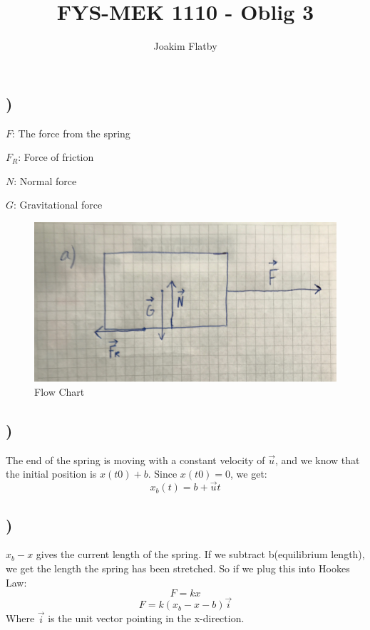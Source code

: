 \documentclass[a4paper,10pt,norsk]{article}
\title{FYS-MEK 1110 - Oblig 3}
\author{Joakim Flatby}
\begin{document}
\maketitle
\section{}


\subsection{)}

$F$: The force from the spring

$F_{R}$: Force of friction

$N$: Normal force

$G$: Gravitational force

\begin{figure}[h!]
        \centering 
        \includegraphics[scale=0.5]{oppg_a.png} 
        \caption{Flow Chart}
\end{figure}

\subsection{)}
The end of the spring is moving with a constant velocity of $\vec{u}$, and we know that the initial position is $x(t0) + b$. Since $x(t0) = 0$, we get:
\[x_{b}(t) = b + \vec{u}t\]

\subsection{)}
$x_{b} - x$ gives the current length of the spring. If we subtract b(equilibrium length), we get the length the spring has been stretched. So if we plug this into Hookes Law:
\[F = kx\]
\[F = k(x_{b} - x - b)\vec{i}\]
Where $\vec{i}$ is the unit vector pointing in the x-direction.
\end{document}
